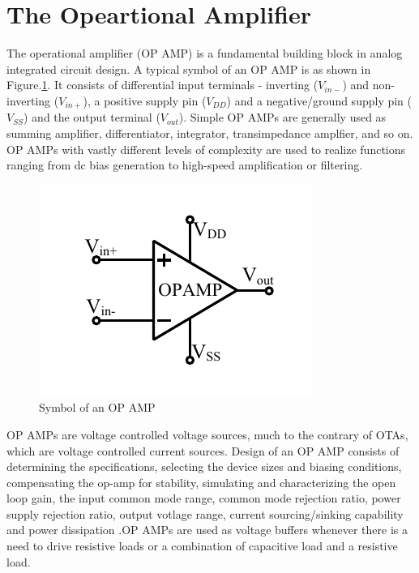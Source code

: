 \vfill
\clearpage

\section{The Opeartional Amplifier}
The operational amplifier (OP AMP) is a fundamental building block in analog integrated circuit design. A typical symbol of an OP AMP is as shown in Figure.\ref{fig:OPAMP_symbol}. It consists of differential input terminals - inverting ($V_{in-}$) and non-inverting ($V_{in+}$), a positive supply pin ($V_{DD}$) and a negative/ground supply pin ($V_{SS}$) and the output terminal ($V_{out}$). Simple OP AMPs are generally used as summing amplifier, differentiator, integrator, transimpedance amplfier, and so on. OP AMPs with vastly different levels of complexity are used to realize functions ranging from dc bias generation to high-speed amplification or filtering.

\begin{figure} [H]
\centering
\includegraphics[scale=1]{Figures/System_Level/OPAMP_Symbol.pdf}
\caption{Symbol of an OP AMP}
\label{fig:OPAMP_symbol}
\end{figure}

OP AMPs are voltage controlled voltage sources, much to the contrary of OTAs, which are voltage controlled current sources. Design of an OP AMP consists of determining the specifications, selecting the device sizes and biasing conditions, compensating the op-amp for stability, simulating and characterizing the open loop gain, the input common mode range, common mode rejection ratio, power supply rejection ratio, output votlage range, current sourcing/sinking capability and power dissipation \cite{razavi_book}.OP AMPs are used as voltage buffers whenever there is a need to drive resistive loads or a combination of capacitive load and a resistive load.


